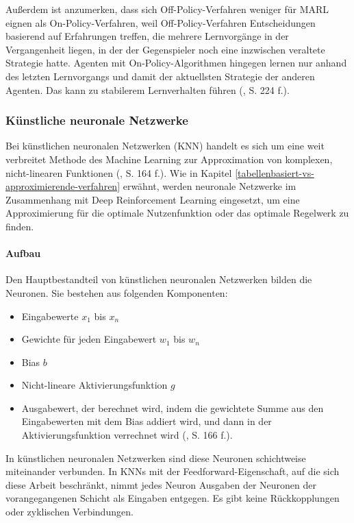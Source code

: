 Außerdem ist anzumerken, dass sich Off-Policy-Verfahren weniger für MARL eignen als On-Policy-Verfahren, weil Off-Policy-Verfahren Entscheidungen basierend auf Erfahrungen treffen, die mehrere Lernvorgänge in der Vergangenheit liegen, in der der Gegenspieler noch eine inzwischen veraltete Strategie hatte. Agenten mit On-Policy-Algorithmen hingegen lernen nur anhand des letzten Lernvorgangs und damit der aktuellsten Strategie der anderen Agenten. Das kann zu stabilerem Lernverhalten führen (\cite{Albrecht.2024}, S. 224 f.).

\subsubsection{Künstliche neuronale Netzwerke}

\label{kuenstliche-neuronale-netzwerke}

Bei künstlichen neuronalen Netzwerken (KNN) handelt es sich um eine weit verbreitet Methode des Machine Learning zur Approximation von komplexen, nicht-linearen Funktionen (\cite{Albrecht.2024}, S. 164 f.). Wie in Kapitel \ref{tabellenbasiert-vs-approximierende-verfahren} erwähnt, werden neuronale Netzwerke im Zusammenhang mit Deep Reinforcement Learning eingesetzt, um eine Approximierung für die optimale Nutzenfunktion oder das optimale Regelwerk zu finden.

\paragraph{Aufbau}

Den Hauptbestandteil von künstlichen neuronalen Netzwerken bilden die Neuronen. Sie bestehen aus folgenden Komponenten:

\begin{itemize}
	\item Eingabewerte $x_1$ bis $x_n$
	\item Gewichte für jeden Eingabewert $w_1$ bis $w_n$
	\item Bias $b$
	\item Nicht-lineare Aktivierungsfunktion $g$
	\item Ausgabewert, der berechnet wird, indem die gewichtete Summe aus den Eingabewerten mit dem Bias addiert wird, und dann in der Aktivierungsfunktion verrechnet wird (\cite{Albrecht.2024}, S. 166 f.).
\end{itemize}

In künstlichen neuronalen Netzwerken sind diese Neuronen schichtweise miteinander verbunden. In KNNs mit der Feedforward-Eigenschaft, auf die sich diese Arbeit beschränkt, nimmt jedes Neuron Ausgaben der Neuronen der vorangegangenen Schicht als Eingaben entgegen. Es gibt keine Rückkopplungen oder zyklischen Verbindungen.

